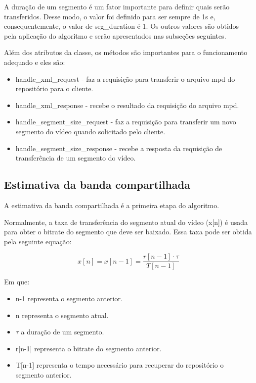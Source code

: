 \documentclass[10pt,twocolumn,letterpaper]{article}
\begin{document}
A duração de um segmento é um fator importante para definir quais serão transferidos. Desse modo, o valor foi definido para ser sempre de 1s e, consequentemente, o valor de seg\_duration é 1. Os outros valores são obtidos pela aplicação do algoritmo e serão apresentados nas subseções seguintes.

Além dos atributos da classe, os métodos são importantes para o funcionamento adequado e eles são:

\begin{itemize}
	\item handle\_xml\_request - faz a requisição para transferir o arquivo mpd do repositório para o cliente.
	\item handle\_xml\_response - recebe o resultado da requisição do arquivo mpd.
	\item handle\_segment\_size\_request - faz a requisição para transferir um novo segmento do vídeo quando solicitado pelo cliente.
	\item handle\_segment\_size\_response - recebe a resposta da requisição de transferência de um segmento do vídeo.
\end{itemize}


\subsection{Estimativa da banda compartilhada}

A estimativa da banda compartilhada é a primeira etapa do algoritmo.

Normalmente, a taxa de transferência do segmento atual do vídeo (x[n]) é usada para obter o bitrate do segmento que deve ser baixado. Essa taxa pode ser obtida pela seguinte equação:

\begin{equation} \label{actual_throughput}
	x[n] = x[n-1] = \frac{r[n-1] \cdot \tau}{T[n-1]} 
\end{equation}

Em que:
\begin{itemize}
	\item n-1 representa o segmento anterior.
	\item n representa o segmento atual.
	\item $\tau$ a duração de um segmento.
	\item r[n-1] representa o bitrate do segmento anterior.
	\item T[n-1] representa o tempo necessário para recuperar do repositório o segmento anterior.
\end{itemize}
\end{document}
